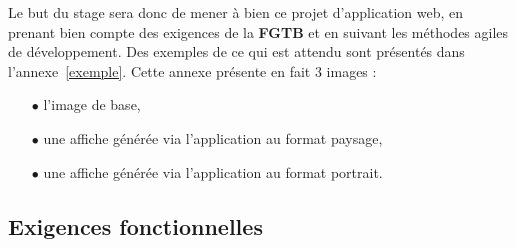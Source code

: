 \documentclass{article}
\begin{document}
\begin{sffamily}
Le but du stage sera donc de mener à bien ce projet d'application web, en prenant bien compte des exigences de la \textbf{FGTB} et en suivant les méthodes agiles de 
développement. Des exemples de ce qui est attendu sont présentés dans l'annexe~\ref{exemple}. Cette annexe présente en fait 3 images : 
\begin{itemize}
\item[$\bullet$]l'image de base,
\item[$\bullet$]une affiche générée via l'application au format paysage,
\item[$\bullet$]une affiche générée via l'application au format portrait.
\end{itemize}


\subsection{Exigences fonctionnelles}


\end{sffamily}
\end{document}
